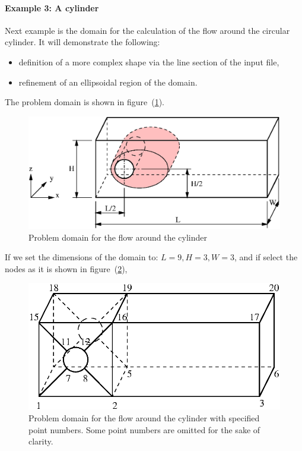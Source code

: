 \documentclass[10pt]{article}
\begin{document}
    \paragraph{Example 3: A cylinder}

    Next example is the domain for the calculation of the flow
    around the circular cylinder. It will demonstrate the following:
    \begin{itemize}
    \item definition of a more complex shape via the line section
          of the input file,
    \item refinement of an ellipsoidal region of the domain.
    \end{itemize}
    The problem domain is shown in figure~(\ref{cyl}).
    \begin{figure}
    \centering
    \includegraphics[scale=0.8]{cyl.eps}
    \caption{Problem domain for the flow around the cylinder}
    \label{cyl}
    \end{figure}
    If we set the dimensions of the domain to: $L=9, H=3, W=3$,
    and if select the nodes as it is shown in figure~(\ref{cylpoints}),
    \begin{figure}
    \centering
    \includegraphics[scale=0.8]{cylpoints.eps}
    \caption{Problem domain for the flow around the cylinder 
             with specified point numbers. Some point numbers
             are omitted for the sake of clarity.}
    \label{cylpoints}
    \end{figure}
\end{document}

